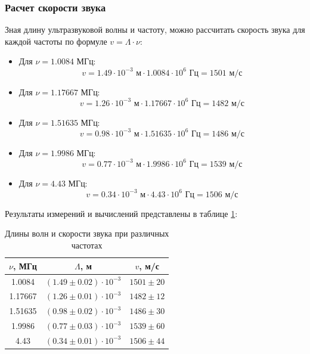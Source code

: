 \subsubsection{Расчет скорости звука}

Зная длину ультразвуковой волны и частоту, можно рассчитать скорость звука для каждой частоты по формуле $v = \Lambda \cdot \nu$:

\begin{itemize}
    \item Для $\nu = 1.0084$ МГц:
    \begin{equation}
        v = 1.49 \cdot 10^{-3} \text{ м} \cdot 1.0084 \cdot 10^{6} \text{ Гц} = 1501 \text{ м/с}
    \end{equation}
    
    \item Для $\nu = 1.17667$ МГц:
    \begin{equation}
        v = 1.26 \cdot 10^{-3} \text{ м} \cdot 1.17667 \cdot 10^{6} \text{ Гц} = 1482 \text{ м/с}
    \end{equation}
    
    \item Для $\nu = 1.51635$ МГц:
    \begin{equation}
        v = 0.98 \cdot 10^{-3} \text{ м} \cdot 1.51635 \cdot 10^{6} \text{ Гц} = 1486 \text{ м/с}
    \end{equation}
    
    \item Для $\nu = 1.9986$ МГц:
    \begin{equation}
        v = 0.77 \cdot 10^{-3} \text{ м} \cdot 1.9986 \cdot 10^{6} \text{ Гц} = 1539 \text{ м/с}
    \end{equation}
    
    \item Для $\nu = 4.43$ МГц:
    \begin{equation}
        v = 0.34 \cdot 10^{-3} \text{ м} \cdot 4.43 \cdot 10^{6} \text{ Гц} = 1506 \text{ м/с}
    \end{equation}
\end{itemize}

Результаты измерений и вычислений представлены в таблице \ref{tab:speeds}:

\begin{longtable}[c]{|c|c|c|}
\caption{Длины волн и скорости звука при различных частотах}
\label{tab:speeds}\\
\hline
$\nu$, МГц & $\Lambda$, м & $v$, м/с \\ \hline
\endfirsthead
%
\endhead
%
1.0084 & $(1.49 \pm 0.02) \cdot 10^{-3}$ & $1501 \pm 20$ \\ \hline
1.17667 & $(1.26 \pm 0.01) \cdot 10^{-3}$ & $1482 \pm 12$ \\ \hline
1.51635 & $(0.98 \pm 0.02) \cdot 10^{-3}$ & $1486 \pm 30$ \\ \hline
1.9986 & $(0.77 \pm 0.03) \cdot 10^{-3}$ & $1539 \pm 60$ \\ \hline
4.43 & $(0.34 \pm 0.01) \cdot 10^{-3}$ & $1506 \pm 44$ \\ \hline
\end{longtable}


